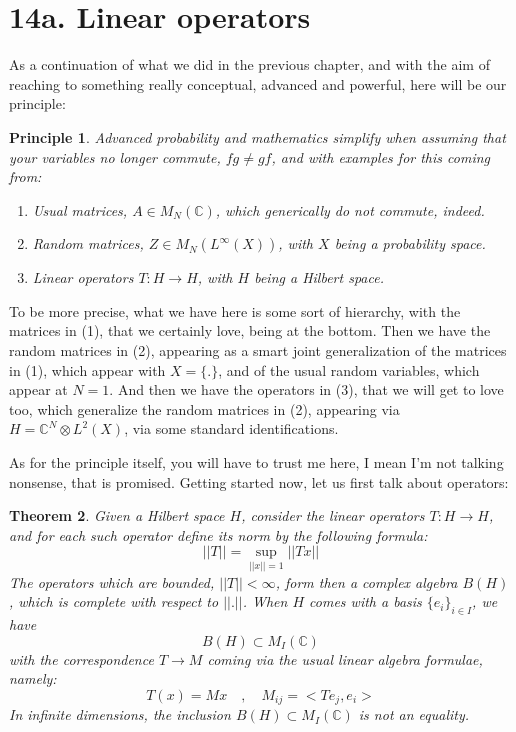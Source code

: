 \documentclass[12pt]{amsbook}
\newtheorem{theorem}{Theorem}[chapter]
\newtheorem{principle}[theorem]{Principle}
\begin{document}
\section*{14a. Linear operators}

As a continuation of what we did in the previous chapter, and with the aim of reaching to something really conceptual, advanced and powerful, here will be our principle:

\begin{principle}
Advanced probability and mathematics simplify when assuming that your variables no longer commute, $fg\neq gf$, and with examples for this coming from:
\begin{enumerate}
\item Usual matrices, $A\in M_N(\mathbb C)$, which generically do not commute, indeed.

\item Random matrices, $Z\in M_N(L^\infty(X))$, with $X$ being a probability space.

\item Linear operators $T:H\to H$, with $H$ being a Hilbert space.
\end{enumerate}
\end{principle}

To be more precise, what we have here is some sort of hierarchy, with the matrices in (1), that we certainly love, being at the bottom. Then we have the random matrices in (2), appearing as a smart joint generalization of the matrices in (1), which appear with $X=\{.\}$, and of the usual random variables, which appear at $N=1$. And then we have the operators in (3), that we will get to love too, which generalize the random matrices in (2), appearing via $H=\mathbb C^N\otimes L^2(X)$, via some standard identifications.

\bigskip

As for the principle itself, you will have to trust me here, I mean I'm not talking nonsense, that is promised. Getting started now, let us first talk about operators:


\begin{theorem}
Given a Hilbert space $H$, consider the linear operators $T:H\to H$, and for each such operator define its norm by the following formula:
$$||T||=\sup_{||x||=1}||Tx||$$
The operators which are bounded, $||T||<\infty$, form then a complex algebra $B(H)$, which is complete with respect to $||.||$. When $H$ comes with a basis $\{e_i\}_{i\in I}$, we have
$$B(H)\subset M_I(\mathbb C)$$
with the correspondence $T\to M$ coming via the usual linear algebra formulae, namely:
$$T(x)=Mx\quad,\quad M_{ij}=<Te_j,e_i>$$
In infinite dimensions, the inclusion $B(H)\subset M_I(\mathbb C)$ is not an equality.
\end{theorem}
\end{document}
